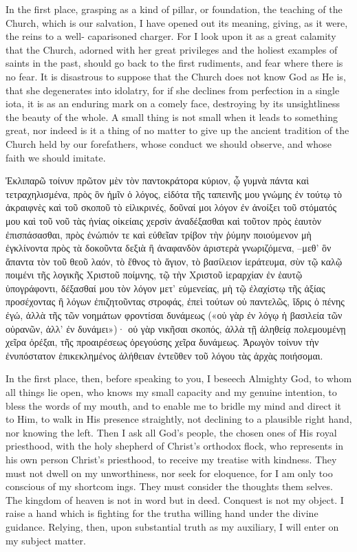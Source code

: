 \documentclass[10pt]{book}
\newcommand{\switchgreek}[1][]{\selectlanguage{polutonikogreek} \switchcolumn*[#1]}
\newcommand{\switchenglish}{\selectlanguage{english} \switchcolumn}
\begin{document}
\begin{paracol}{2}
In the first place, grasping as a kind of
pillar, or foundation, the teaching of the Church,
which is our salvation, I have opened out its
meaning, giving, as it were, the reins to a well-
caparisoned charger. For I look upon it as a
great calamity that the Church, adorned with
her great privileges and the holiest examples of
saints in the past, should go back to the first
rudiments, and fear where there is no fear. It
is disastrous to suppose that the Church does
not know God as He is, that she degenerates
into idolatry, for if she declines from perfection
in a single iota, it is as an enduring mark on a
comely face, destroying by its unsightliness the
beauty of the whole. A small thing is not
small when it leads to something great, nor
indeed is it a thing of no matter to give up the
ancient tradition of the Church held by our
forefathers, whose conduct we should observe,
and whose faith we should imitate.

\switchgreek

Ἐκλιπαρῶ τοίνυν πρῶτον μὲν τὸν παντοκράτορα κύριον, ᾧ γυμνὰ πάντα καὶ τετραχηλισμένα, πρὸς ὃν ἡμῖν ὁ λόγος, εἰδότα τῆς ταπεινῆς μου γνώμης ἐν τούτῳ τὸ ἀκραιφνὲς καὶ τοῦ σκοποῦ τὸ εἰλικρινές, δοῦναί μοι λόγον ἐν ἀνοίξει τοῦ στόματός μου καὶ τοῦ νοῦ τὰς ἡνίας οἰκείαις χερσὶν ἀναδέξασθαι καὶ τοῦτον πρὸς ἑαυτὸν ἐπισπάσασθαι, πρὸς ἐνώπιόν τε καὶ εὐθεῖαν τρίβον τὴν ῥύμην ποιούμενον μὴ ἐγκλίνοντα πρὸς τὰ δοκοῦντα δεξιὰ ἢ ἀναφανδὸν ἀριστερὰ γνωριζόμενα, –μεθ’ ὃν ἅπαντα τὸν τοῦ θεοῦ λαόν, τὸ ἔθνος τὸ ἅγιον, τὸ βασίλειον ἱεράτευμα, σὺν τῷ καλῷ ποιμένι τῆς λογικῆς Χριστοῦ ποίμνης, τῷ τὴν Χριστοῦ ἱεραρχίαν ἐν ἑαυτῷ ὑπογράφοντι, δέξασθαί μου τὸν λόγον μετ’ εὐμενείας, μὴ τῷ ἐλαχίστῳ τῆς ἀξίας προσέχοντας ἢ λόγων ἐπιζητοῦντας στροφάς, ἐπεὶ τούτων οὐ παντελῶς, ἴδρις ὁ πένης ἐγώ, ἀλλὰ τῆς τῶν νοημάτων φροντίσαι δυνάμεως («οὐ γὰρ ἐν λόγῳ ἡ βασιλεία τῶν οὐρανῶν, ἀλλ’ ἐν δυνάμει»)· οὐ γὰρ νικῆσαι σκοπός, ἀλλὰ τῇ ἀληθείᾳ πολεμουμένῃ χεῖρα ὀρέξαι, τῆς προαιρέσεως ὀρεγούσης χεῖρα δυνάμεως.
Ἀρωγὸν τοίνυν τὴν ἐνυπόστατον ἐπικεκλημένος ἀλήθειαν ἐντεῦθεν τοῦ λόγου τὰς ἀρχὰς ποιήσομαι.

\switchenglish

In the first place, then, before speaking to
you, I beseech Almighty God, to whom all
things lie open, who knows my small capacity
and my genuine intention, to bless the words
of my mouth, and to enable me to bridle my
mind and direct it to Him, to walk in His
presence straightly, not declining to a plausible
right hand, nor knowing the left. Then I ask
all God's people, the chosen ones of His royal
priesthood, with the holy shepherd of Christ's
orthodox flock, who represents in his own
person Christ's priesthood, to receive my
treatise with kindness. They must not dwell
on my unworthiness, nor seek for eloquence,
for I am only too conscious of my shortcom
ings. They must consider the thoughts them
selves. The kingdom of heaven is not in word
but in deed. Conquest is not my object. I
raise a hand which is fighting for the truth\textemdash a
willing hand under the divine guidance. Relying, then, upon substantial truth as my auxiliary,
I will enter on my subject matter.


\end{paracol}
\end{document}
